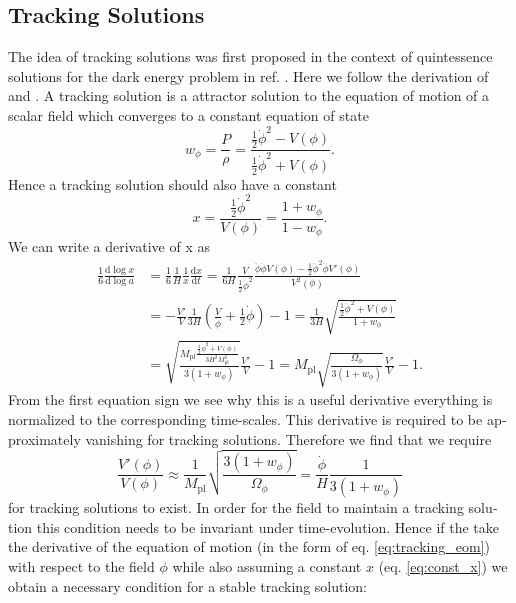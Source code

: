 \documentclass[master,       %
               twoside,        %
               BCOR10mm,       %
               english,ngerman, %
               ]{GAUBM}
\begin{document}
\begin{otherlanguage}{english}
\subsection{Tracking Solutions}
The idea of tracking solutions was first proposed in the context of quintessence solutions for the dark energy problem in ref. \cite{tracking_solutions_Steinhardt:1999nw}.
Here we follow the derivation of \cite[appendix A]{Deformed_potential_Bae_2019} and \cite{tracking_solutions_Steinhardt:1999nw}.
A tracking solution is a attractor solution to the equation of motion of a scalar field which converges to a constant equation of state
\begin{equation}
	w_\phi = \frac{P}{\rho} = \frac{\frac{1}{2} \dot{\phi}^2 - V(\phi)}{\frac{1}{2} \dot{\phi}^2 + V(\phi)}.
\end{equation}
Hence a tracking solution should also have a constant
\begin{equation}
	x = \frac{\frac{1}{2} \dot{\phi}^2}{V(\phi)} = \frac{1 + w_\phi}{1 - w_\phi}.
\end{equation}
We can write a derivative of x as
\begin{align}
	\label{eq:tracking_eom}
	\frac{1}{6} \frac{\mathrm{d} \log x}{\mathrm{d} \log a}
	&= \frac{1}{6} \frac{1}{H} \frac{1}{x} \frac{\mathrm{d} x}{\mathrm{d} t}
	= \frac{1}{6 H} \frac{V}{\frac{1}{2} \dot{\phi}^2} \frac{\ddot{\phi} \dot{\phi} V(\phi) - \frac{1}{2} \dot{\phi}^2 \dot{\phi} V'(\phi)}{V^2(\phi)} \nonumber \\
	&= - \frac{V'}{V} \frac{1}{3 H} \left( \frac{V}{\dot{\phi}} + \frac{1}{2} \dot{\phi} \right) - 1
	= \frac{1}{3 H} \sqrt{ \frac{ \frac{1}{2} \dot{\phi}^2 + V(\phi) }{1 + w_\phi}} \nonumber \\
	&= \sqrt{ \frac{ M_\mathrm{pl} \frac{ \frac{1}{2} \dot{\phi}^2 + V(\phi) } {3 H^2 M_\mathrm{pl}^2} }{3(1 + w_\phi)}} \frac{V'}{V} - 1
	= M_\mathrm{pl} \sqrt{ \frac{\Omega_\phi}{3(1 + w_\phi)}} \frac{V'}{V} - 1.
\end{align}
From the first equation sign we see why this is a useful derivative everything is normalized to the corresponding time-scales.
This derivative is required to be approximately vanishing for tracking solutions. Therefore we find that we require
\begin{equation}
	\label{eq:const_x}
	\frac{V'(\phi)}{V(\phi)} \approx \frac{1}{M_\mathrm{pl}} \sqrt{\frac{3(1 + w_\phi)}{\Omega_\phi}} = \frac{\dot{\phi}}{H} \frac{1}{3(1 + w_\phi)}
\end{equation}
for tracking solutions to exist.
In order for the field to maintain a tracking solution this condition needs to be invariant under time-evolution. Hence if the take the derivative of the equation of motion (in the form of eq. \eqref{eq:tracking_eom}) with respect to the field $\phi$ while also assuming a constant $x$ (eq. \eqref{eq:const_x}) we obtain a necessary condition for a stable tracking solution:

\end{otherlanguage}
\end{document}
